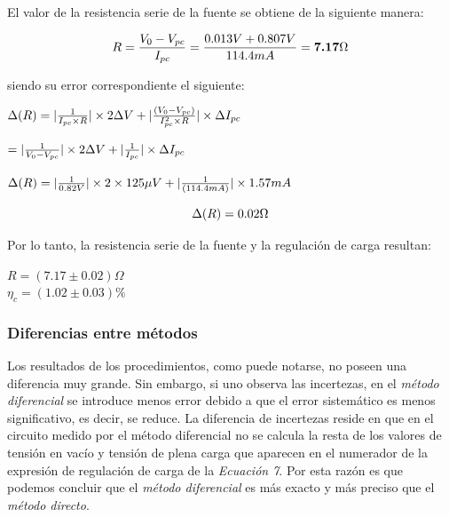\documentclass{article}
\begin{document}
\bigskip\bigskip


\noindent El valor de la resistencia serie de la fuente se obtiene de la siguiente manera:
\bigskip

\begin{equation}
	R = {V_{0} - V_{pc} \over I_{pc}} = {0.013V +0.807V\over 114.4mA} = \textbf{7.17$\Omega$} \\
\end{equation}
\bigskip


\noindent siendo su error correspondiente el siguiente:
\bigskip


\begin{center}
	$\Delta(R) = |{1\over I_{pc} \times R}|\times 2\Delta V + |{(V_{0}-V_{pc})  \over  I_{pc}^2  \times R}| \times \Delta I_{pc} $ \\
\end{center}

\begin{center}
$= |{1\over V_{0} - V_{pc}}|\times 2\Delta V + |{1 \over  I_{pc}}| \times \Delta I_{pc}$\\
\end{center}

\begin{center}
	$\Delta(R) = |{1\over 0.82V}|\times 2\times 125\mu V + |{1  \over  (114.4mA)}| \times 1.57mA$ \\
\end{center}


\begin{equation}
	\Delta(R) = \textbf{$0.02 \Omega$}\\
\end{equation}
\bigskip\bigskip


\noindent Por lo tanto, la resistencia serie de la fuente y la regulación de carga resultan:
\medskip

\begin{center}
	$R = (7.17 \pm 0.02)\Omega $ \\ \medskip
	$\eta_c = (1.02 \pm 0.03)\% $ 
\end{center}
\bigskip\bigskip





\subsubsection{Diferencias entre métodos}

	Los resultados de los procedimientos, como puede notarse, no poseen una diferencia muy grande. Sin embargo, si uno observa las incertezas, en el \textit{método diferencial} se introduce menos error debido a que el error sistemático es menos significativo, es decir, se reduce. La diferencia de incertezas reside en que en el circuito medido por el método diferencial no se calcula la resta de los valores de tensión en vacío y tensión de plena carga que aparecen en el numerador de la expresión de regulación de carga de la \textit{Ecuación 7}. Por esta razón es que podemos concluir que el \textit{método diferencial} es más exacto y más preciso que el \textit{método directo}.
\bigskip\bigskip\medskip
\end{document}
